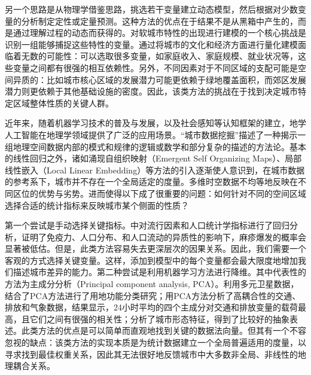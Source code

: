 另一个思路是从物理学借鉴思路，挑选若干变量建立动态模型，然后根据对少数变量的分析制定定性或定量预测\cite{riccardo2012towards, castellano2009statistical, jay2020neighbourhood}。这种方法的优点在于结果不是从黑箱中产生的，而是通过理解过程的动态而获得的。对软城市特性的出现进行建模的一个核心挑战是识别一组能够捕捉这些特性的变量。通过将城市的文化和经济方面进行量化建模面临着无数的可能性：可以选取很多变量，如家庭收入、家庭规模、就业状况等，这些变量之间都有很强的相互依赖性。另外，不同因素对于不同区域的支配可能是空间异质的：比如城市核心区域的发展潜力可能更依赖于绿地覆盖面积，而郊区发展潜力则更依赖于其他基础设施的密度。因此，该类方法的挑战在于找到决定城市特定区域整体性质的关键人群。

近年来，随着机器学习技术的普及与发展，以及社会感知等认知框架的建立，地学人工智能在地理学领域提供了广泛的应用场景。“城市数据挖掘”描述了一种揭示一组地理空间数据内部的模式和规律的逻辑或数学和部分复杂的描述的方法论\cite{behnisch2009urban, bendimerad2016unsupervised}。基本的线性回归之外，诸如涌现自组织映射（Emergent Self Organizing Maps）\cite{ultsch2005esom}、局部线性嵌入（Local Linear Embedding）\cite{roweis2000nonlinear}等方法的引入逐渐使人意识到，在城市数据的参考系下，城市并不存在一个全局适定的度量。多维时空数据不均等地反映在不同区位的优势与劣势。进而使得以下成了很重要的问题：如何针对不同的空间区域选择合适的统计指标来反映城市某个侧面的性质？

第一个尝试是手动选择关键指标。\cite{bosetti2020heterogeneity}中对流行因素和人口统计学指标进行了回归分析，证明了免疫力、人口分布、和人口流动的异质性的影响下，麻疹爆发的概率会显著被低估。但是，此类方法容易失去更深层次的因果关系。因此，我们需要一个客观的方式选择关键变量。这样，添加到模型中的每个变量都会最大限度地增加我们描述城市差异的能力。第二种尝试是利用机器学习方法进行降维。其中代表性的方法为主成分分析（Principal component analysis, PCA）。\cite{deng2008pca}利用多元卫星数据，结合了PCA方法进行了用地功能分类研究；\cite{nagendra2003principal}用PCA方法分析了高耦合性的交通、排放和气象数据，结果显示，24小时平均的四个主成分对交通和排放变量的载荷最高，且它们之间有很强的相关性；\cite{palmason2005classification}分析了城市形态特征，得到了比较好的抽象表述。此类方法的优点是可以简单而直观地找到关键的数据法向量。但其有一个不容忽视的缺点：该类方法的实现本质是为统计数据建立一个全局普遍适用的度量，以寻求找到最佳权重关系，因此其无法很好地反馈城市中大多数非全局、非线性的地理耦合关系。

